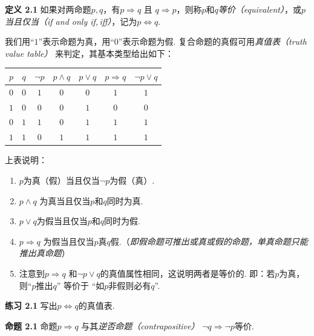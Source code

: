 \documentclass{article}
\begin{document}
\textbf{定义 2.1} 如果对两命题$p,q$，有$p\Rightarrow q$ 且 $q\Rightarrow p$，则称$p$和$q$\textit{等价（equivalent）}，或$p$\textit{当且仅当（if and only if,\,iff）}，记为$p\Longleftrightarrow q$. 

\vspace{3pt}

我们用$“1”$表示命题为真，用$“0”$表示命题为假. 复合命题的真假可用\textit{真值表（truth value table）} 来判定，其基本类型给出如下：
\begin{center}
    
    \begin{tabular}{c|c|c|c|c|c|c}
       $p$ & $q$ & $\neg p$ & $p\land q$ & $p\lor q$ & $p\Rightarrow q$ & $\neg p\lor q$\\
       \hline
       $0$ & $0$ & $1$ & $0$ & $0$ & $1$ & $1$ \\
       \hline
       $1$ & $0$ & $0$ & $0$ & $1$ & $0$ & $0$ \\
       \hline 
       $0$ & $1$ & $1$ & $0$ & $1$ & $1$ & $1$ \\
       \hline
       $1$ & $1$ & $0$ & $1$ & $1$ & $1$ & $1$ \\

    \end{tabular}

\end{center}

上表说明：
\begin{enumerate}
    \item $p$为真（假）当且仅当$\neg p$为假（真）.
    \item $p\land q$ 为真当且仅当$p$和$q$同时为真. 
    \item $p\lor q$为假当且仅当$p$和$q$同时为假.
    \item $p\Rightarrow q$ 为假当且仅当$p$真$q$假.（\textit{即假命题可推出或真或假的命题，单真命题只能推出真命题}）
    \item 注意到$p\Rightarrow q$ 和$\neg p\lor q$的真值属性相同，这说明两者是等价的. 即：若$p$为真，则“$p$推出$q$” 等价于 “如$p$非假则必有$q$”. 
    \end{enumerate}

\textbf{练习 2.1} 写出$p\Longleftrightarrow 
 q$的真值表. 

\vspace{3pt}

\textbf{命题 2.1} 命题$p\Rightarrow q$ 与其\textit{逆否命题（contrapositive）} $\neg q\Rightarrow \neg p$等价. 

\vspace{3pt}
\end{document}
